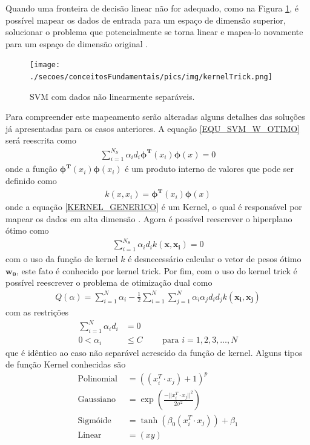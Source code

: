Quando uma fronteira de decisão linear não for adequado, como na Figura \ref{FIGURA_SVM_Caso_Nao_Separavel_KERNEL_TRICK}, é possível mapear os dados de entrada para um espaço de dimensão superior, solucionar o problema que potencialmente se torna linear e mapea-lo novamente para um espaço de dimensão original \cite{Haykin2007}.
\begin{figure}[H]
  \centering
  \caption{SVM com dados não linearmente separáveis.}
  \texttt{[image: ./secoes/conceitosFundamentais/pics/img/kernelTrick.png]}
  \label{FIGURA_SVM_Caso_Nao_Separavel_KERNEL_TRICK}
\end{figure}
Para compreender este mapeamento serão alteradas alguns detalhes das soluções já apresentadas para os casos anteriores. A equação \eqref{EQU_SVM_W_OTIMO} será reescrita como
\begin{align}
\sum\limits_{i=1}^{N_{S}} \alpha_{i}d_{i}\mathbf{\phi^{T}}(x_{i})\mathbf{\phi}(x) = 0
\end{align}
onde a função \(\mathbf{\phi^{T}}(x_{i})\mathbf{\phi}(x_{i})\) é um produto interno de valores que pode ser definido como
\begin{align}
k(x, x_{i}) = \mathbf{\phi^{T}}(x_{i})\mathbf{\phi}(x) \label{KERNEL_GENERICO}
\end{align}
onde a equação \eqref{KERNEL_GENERICO} é um Kernel, o qual é responsável por mapear os dados em alta dimensão \cite{Shawe2004}. Agora é possível reescrever o hiperplano ótimo como
\begin{align}
\sum\limits_{i=1}^{N_{S}} \alpha_{i}d_{i}k(\mathbf{x}, \mathbf{x_{i}}) = 0
\end{align}
com o uso da função de kernel \(k\) é desnecessário calcular o vetor de pesos ótimo \(\mathbf{w_{0}}\), este fato é conhecido por kernel trick. Por fim, com o uso do kernel trick é possível reescrever o problema de otimização dual como
\begin{align}
Q(\alpha) = \sum\limits_{i=1}^{N} \alpha_{i} - \frac{1}{2} \sum\limits_{i=1}^{N} \sum\limits_{j=1}^{N} \alpha_{i}\alpha_{j}d_{i}d_{j} k(\mathbf{x_{i}}, \mathbf{x_{j}})
\end{align}
com as restrições
\begin{align}
\sum\limits_{i=1}^{N} \alpha_{i}d_{i} &= 0 \\
0 < \alpha_{i} &\leq C	\qquad \textrm{ para } i = 1, 2, 3, \ldots, N
\end{align}
que é idêntico ao caso não separável acrescido da função de kernel. Alguns tipos de função Kernel conhecidas \cite{Haykin2007} são
\begin{align}
\textrm{Polinomial } &= ((x_{i}^{T} \cdot x_{j})+1)^{p}								\\
\textrm{Gaussiano }  &= \exp(\frac{-||x_{i}^{T} \cdot x_{j}||^{2}}{2\sigma^{2}})	\\
\textrm{Sigmóide }   &= \tanh(\beta_{0} (x_{i}^{T} \cdot x_{j})) +  \beta_{1} 		\\
\textrm{Linear }   &= (xy)
\end{align}


